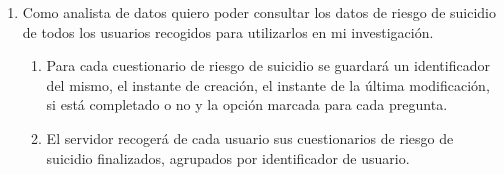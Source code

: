         \begin{enumerate}[resume=req-usuario,label=\textbf{\texttt{RU-\arabic*}}]
            \item \label{req:usuario:analista_suicidio} Como analista de datos quiero poder consultar los datos de riesgo de suicidio de todos los usuarios recogidos para utilizarlos en mi investigación.
            \begin{enumerate}[resume=req-funcionales,label=\textbf{\texttt{RF-\arabic*}}]
                \item \label{req:funcionales:suicidio_diario_formato} Para cada cuestionario de riesgo de suicidio se guardará un identificador del mismo, el instante de creación, el instante de la última modificación, si está completado o no y la opción marcada para cada pregunta.
                \item \label{req:funcionales:suicidio_finalizado_servidor} El servidor recogerá de cada usuario sus cuestionarios de riesgo de suicidio finalizados, agrupados por identificador de usuario.
            \end{enumerate}
        \end{enumerate}
